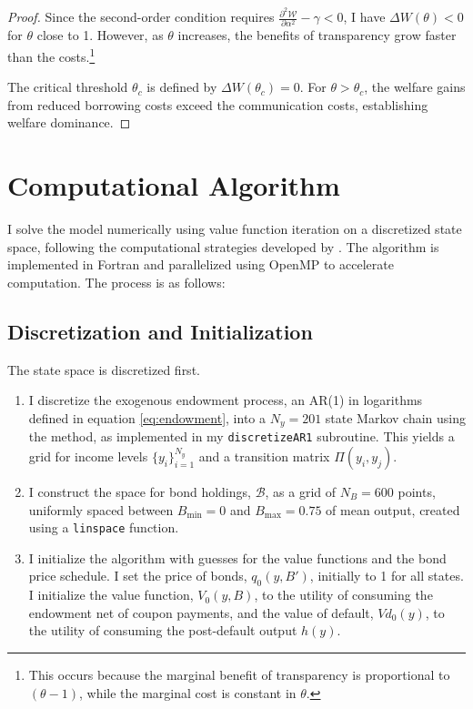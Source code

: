 \documentclass[12pt]{article}
\theoremstyle{plain}
\begin{document}
\begin{proof}
	Since the second-order condition requires $\frac{\partial^2
			\mathcal{W}}{\partial \alpha^2} - \gamma < 0$, I have $\Delta W(\theta) < 0$
	for $\theta$ close to 1. However, as $\theta$ increases, the benefits of
	transparency grow faster than the costs.\footnote{This occurs because the
		marginal benefit of transparency is proportional to $(\theta-1)$, while the
		marginal cost is constant in $\theta$.}

	The critical threshold $\theta_c$ is defined by $\Delta W(\theta_c) = 0$. For
	$\theta > \theta_c$, the welfare gains from reduced borrowing costs exceed the
	communication costs, establishing welfare dominance.
\end{proof}

\clearpage

\section{Computational Algorithm}\label{app:computations}

I solve the model numerically using value function iteration on a discretized
state space, following the computational strategies developed by
\citet{MIHALACHEOREEF2024}. The algorithm is implemented in Fortran and
parallelized using OpenMP to accelerate computation. The process is as follows:

\subsection{Discretization and Initialization}
The state space is discretized first.
\begin{enumerate}
	\item I discretize the exogenous endowment process, an AR(1) in logarithms defined in
	      equation \eqref{eq:endowment}, into a $N_y=201$ state Markov chain using the
	      \citet{Tauchen1986} method, as implemented in my \texttt{discretizeAR1}
	      subroutine. This yields a grid for income levels $\{y_i\}_{i=1}^{N_y}$ and a
	      transition matrix $\Pi(y_i, y_j)$.
	\item I construct the space for bond holdings, $\mathcal{B}$, as a grid of $N_B =
		      600$ points, uniformly spaced between $B_{\min}=0$ and $B_{\max}=0.75$ of mean
	      output, created using a \texttt{linspace} function.
	\item I initialize the algorithm with guesses for the value functions and the bond
	      price schedule. I set the price of bonds, $q_0(y, B')$, initially to 1 for all
	      states. I initialize the value function, $V_0(y, B)$, to the utility of
	      consuming the endowment net of coupon payments, and the value of default,
	      $Vd_0(y)$, to the utility of consuming the post-default output $h(y)$.
\end{enumerate}
\end{document}
